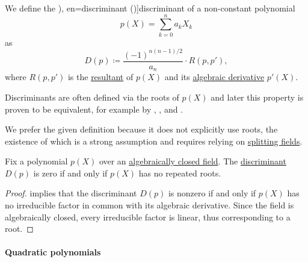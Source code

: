 \begin{definition}\label{def:discriminant}
  We define the \term[ru=дискриминант (\cite[141]{Винберг2014Алгебра}), en=discriminant (\cite[223]{Rotman2015AlgebraVol1})]{discriminant} of a non-constant polynomial
  \begin{equation*}
    p(X) = \sum_{k=0}^n a_k X_k
  \end{equation*}
  as
  \begin{equation*}
    D(p) \coloneqq \frac {(-1)^{n(n-1)/2}} {a_n} \cdot R(p, p'),
  \end{equation*}
  where \( R(p, p') \) is the \hyperref[def:resultant]{resultant} of \( p(X) \) and its \hyperref[def:algebraic_derivative]{algebraic derivative} \( p'(X) \).
\end{definition}
\begin{comments}
  \item Discriminants are often defined via the roots of \( p(X) \) and later this property is proven to be equivalent, for example by
  ,
  ,
   and
  .

  We prefer the given definition because it does not explicitly use roots, the existence of which is a strong assumption and requires relying on \hyperref[def:splitting_field]{splitting fields}.
\end{comments}

\begin{proposition}\label{thm:discriminant_invertibility}
  Fix a polynomial \( p(X) \) over an \hyperref[def:algebraically_closed_field]{algebraically closed field}. The \hyperref[def:discriminant]{discriminant} \( D(p) \) is zero if and only if \( p(X) \) has no repeated roots.
\end{proposition}
\begin{proof}
   implies that the discriminant \( D(p) \) is nonzero if and only if \( p(X) \) has no irreducible factor in common with its algebraic derivative. Since the field is algebraically closed, every irreducible factor is linear, thus corresponding to a root.
\end{proof}

\paragraph{Quadratic polynomials}

